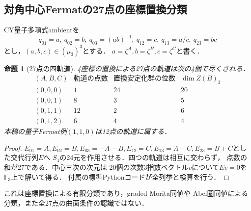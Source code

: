 \documentclass[11pt,a4paper]{ltjsarticle}
\newtheorem{proposition}[theorem]{命題}
\theoremstyle{definition}\newtheorem{definition}[theorem]{定義}
\begin{document}
\subsection{対角中心Fermatの27点の座標置換分類}
CY量子多項式ambientを
\[
 q_{01}=a,\ q_{02}=b,\ q_{03}=(ab)^{-1},\
 q_{12}=c,\ q_{13}=a/c,\ q_{23}=bc
\]
とし，$(a,b,c)\in(\mu_3)^3$とする．
$a=\zeta^A,b=\zeta^B,c=\zeta^C$と書く．
\begin{proposition}[27点の四軌道]\label{prop:fermat-27-orbits}
4座標の置換による27点の軌道は次の4個で尽くされる．
\[
\begin{array}{c|r|r|r}
(A,B,C)&\text{軌道の点数}&\text{置換安定化群の位数}&\dim Z(B)_3\\\hline
(0,0,0)&1&24&20\\
(0,0,1)&8&3&5\\
(0,1,1)&12&2&6\\
(0,1,2)&6&4&4
\end{array}
\]
本稿の量子Fermat例$(1,1,0)$は12点の軌道に属する．
\end{proposition}
\begin{proof}
$E_{01}=A,E_{02}=B,E_{03}=-A-B,E_{12}=C,
E_{13}=A-C,E_{23}=B+C$とした交代行列$E$へ
$S_4$の24元を作用させる．四つの軌道は相互に交わらず，
点数の和が27である．中心三次の次元は
20個の次数3指数ベクトル$v$について$Ev=0$を
$\mathbb F_3$上で解いて得る．
付属の標準Pythonコードが全列挙と検算を行う．
\end{proof}
これは座標置換による有限分類であり，graded Morita同値や
Abel圏同値による分類，また全27点の曲面条件の認識ではない．







\end{document}
